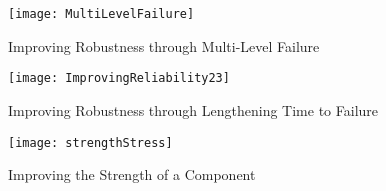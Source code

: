 \begin{figure}
  \centering
  \texttt{[image: MultiLevelFailure]}
  \label{fig:MultiLevelFailure}
  \caption{Improving Robustness through Multi-Level Failure}
\end{figure}

\begin{figure}
  \centering
  \texttt{[image: ImprovingReliability23]}
  \label{fig:ImpRel23}
  \caption{Improving Robustness through Lengthening Time to Failure}
\end{figure}



\begin{figure}
  \centering
  \texttt{[image: strengthStress]}
  \label{fig:strengthStress}
  \caption{Improving the Strength of a Component}
\end{figure}



  
